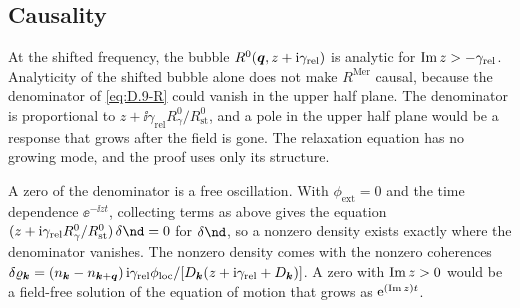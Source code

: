 \subsection*{Causality}

At the shifted frequency, the bubble $R^0(\bm{q},z + \mathrm{i}\gamma_{\mathrm{rel}})$ is analytic for $\operatorname{Im} z > -\gamma_{\mathrm{rel}}$. Analyticity of the shifted bubble alone does not make $R^{\mathrm{Mer}}$ causal, because the denominator of \cref{eq:D.9-R} could vanish in the upper half plane. The denominator is proportional to $z + \ii\gamma_{\mathrm{rel}}R^0_\gamma/R^0_{\mathrm{st}}$, and a pole in the upper half plane would be a response that grows after the field is gone. The relaxation equation has no growing mode, and the proof uses only its structure.

A zero of the denominator is a free oscillation. With $\phi_{\mathrm{ext}} = 0$ and the time dependence $\ee^{-\ii zt}$, collecting terms as above gives the equation $(z + \ii\gamma_{\mathrm{rel}}R^0_\gamma/R^0_{\mathrm{st}})\,\delta\nd = 0$ for $\delta\nd$, so a nonzero density exists exactly where the denominator vanishes. The nonzero density comes with the nonzero coherences $\delta\varrho_{\bm{k}} = (n_{\bm{k}} - n_{\bm{k}+\bm{q}})\,\mathrm{i}\gamma_{\mathrm{rel}}\phi_{\mathrm{loc}}/[D_{\bm{k}}(z + \mathrm{i}\gamma_{\mathrm{rel}} + D_{\bm{k}})]$. A zero with $\operatorname{Im} z > 0$ would be a field-free solution of the equation of motion that grows as $\mathrm{e}^{(\operatorname{Im} z)t}$.


